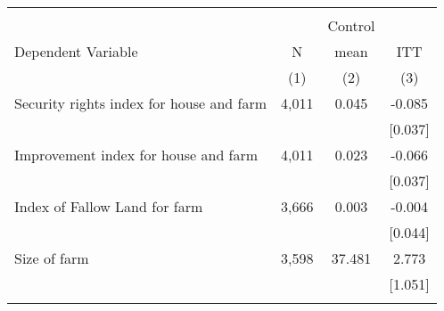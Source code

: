 \begin{tabular}{lccc}
\hline \noalign{\smallskip} &  &  & \\
 &  & Control & \\
Dependent Variable & N & mean & ITT\\
 & (1) & (2) & (3)\\
\noalign{\smallskip}\hline \noalign{\smallskip}Security rights index for house and farm & 4,011 & 0.045 & -0.085\\
 &  &  & [0.037]\\
Improvement index for house and farm & 4,011 & 0.023 & -0.066\\
 &  &  & [0.037]\\
Index of Fallow Land for farm & 3,666 & 0.003 & -0.004\\
 &  &  & [0.044]\\
Size of farm & 3,598 & 37.481 & 2.773\\
 &  &  & [1.051]\\
\noalign{\smallskip}\hline\end{tabular}
